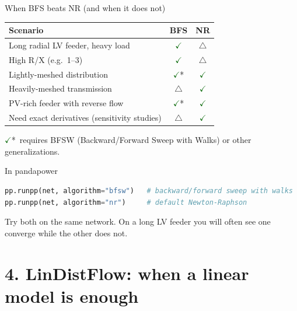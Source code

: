 \documentclass[aspectratio=169,10pt]{beamer}
\newcommand{\checkitem}{\textcolor{darkgreen}{\Large$\checkmark$}\;}
\newcommand{\warnitem}{\textcolor{warnorange}{\Large$\triangle$}\;}
\begin{document}
\begin{frame}[fragile]{When BFS beats NR (and when it does not)}
\centering
\small
\begin{tabular}{lcc}
\toprule
Scenario & BFS & NR \\
\midrule
Long radial LV feeder, heavy load & \checkitem & \warnitem \\
High R/X (e.g.\ 1--3) & \checkitem & \warnitem \\
Lightly-meshed distribution & \checkitem* & \checkitem \\
Heavily-meshed transmission & \warnitem & \checkitem \\
PV-rich feeder with reverse flow & \checkitem* & \checkitem \\
Need exact derivatives (sensitivity studies) & \warnitem & \checkitem \\
\bottomrule
\end{tabular}
\vspace{0.5em}
\footnotesize \checkitem*\ requires BFSW (Backward/Forward Sweep with Walks) or other generalizations.
\vspace{0.6em}
\begin{block}{In pandapower}
\begin{lstlisting}[language=Python, basicstyle=\ttfamily\scriptsize]
pp.runpp(net, algorithm="bfsw")   # backward/forward sweep with walks
pp.runpp(net, algorithm="nr")     # default Newton-Raphson
\end{lstlisting}
Try both on the same network. On a long LV feeder you will often see one converge while the other does not.
\end{block}
\end{frame}

\section*{4. LinDistFlow: when a linear model is enough}
\end{document}
